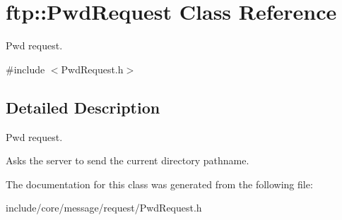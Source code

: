 \hypertarget{classftp_1_1_pwd_request}{\section{ftp\-:\-:Pwd\-Request Class Reference}
\label{classftp_1_1_pwd_request}
}


Pwd request.  




{\ttfamily \#include $<$Pwd\-Request.\-h$>$}



\subsection{Detailed Description}
Pwd request. 

Asks the server to send the current directory pathname. 

The documentation for this class was generated from the following file\-:\begin{DoxyCompactItemize}
\item 
include/core/message/request/Pwd\-Request.\-h\end{DoxyCompactItemize}
